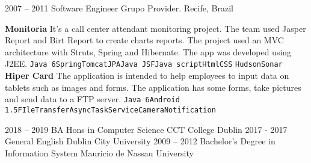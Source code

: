 \documentclass[9pt]{developercv} %
\begin{document}
\begin{entrylist}
{}
\entry
		{2007 -- 2011}
		{Software Engineer}
		{Grupo Provider. Recife, Brazil}
{\newline
  \textbf{Monitoria} It's a call center attendant monitoring project. The team used Jasper Report and Birt Report to create charts reports. The project used an MVC architecture with Struts, Spring and Hibernate. The app was developed using J2EE.\newline
{\texttt{Java 6}\slashsep\texttt{Spring}\slashsep\texttt{Tomcat}\slashsep\texttt{JPA}\slashsep\texttt{Java JSF}\slashsep\texttt{Java script}\slashsep\texttt{Html}\slashsep\texttt{CSS}} \slashsep\texttt{Hudson}\slashsep\texttt{Sonar}
\newline
\newline
\textbf{Hiper Card}  The application is intended to help employees to input data on tablets such as images and forms. The application has some forms, take pictures and send data to a FTP server.
\newline
{\texttt{Java 6}\slashsep\texttt{Android 1.5}\slashsep\texttt{FIleTransfer}\slashsep\texttt{AsyncTask}\slashsep\texttt{Service}\slashsep\texttt{Camera}\slashsep\texttt{Notification}}

}
\end{entrylist}



\begin{entrylist}
	\entry
		{2018 -- 2019}
		{BA Hons in Computer Science}
		{CCT College Dublin}
		{}
	\entry
		{2017 - 2017}
		{General English}
		{Dublin City University}
		{}
	\entry
		{2009 -- 2012}
		{Bachelor's Degree in Information System}
		{Mauricio de Nassau University}
		{}
\end{entrylist}

\end{document}
